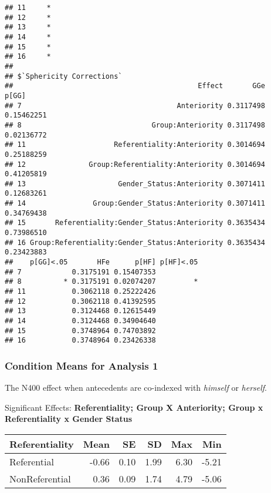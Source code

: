 \documentclass[
]{article}
\begin{document}
\begin{verbatim}
## 11     *
## 12     *
## 13     *
## 14     *
## 15     *
## 16     *
## 
## $`Sphericity Corrections`
##                                            Effect       GGe      p[GG]
## 7                                     Anteriority 0.3117498 0.15462251
## 8                               Group:Anteriority 0.3117498 0.02136772
## 11                     Referentiality:Anteriority 0.3014694 0.25188259
## 12               Group:Referentiality:Anteriority 0.3014694 0.41205819
## 13                      Gender_Status:Anteriority 0.3071411 0.12683261
## 14                Group:Gender_Status:Anteriority 0.3071411 0.34769438
## 15       Referentiality:Gender_Status:Anteriority 0.3635434 0.73986510
## 16 Group:Referentiality:Gender_Status:Anteriority 0.3635434 0.23423883
##    p[GG]<.05       HFe      p[HF] p[HF]<.05
## 7            0.3175191 0.15407353          
## 8          * 0.3175191 0.02074207         *
## 11           0.3062118 0.25222426          
## 12           0.3062118 0.41392595          
## 13           0.3124468 0.12615449          
## 14           0.3124468 0.34904640          
## 15           0.3748964 0.74703892          
## 16           0.3748964 0.23426338
\end{verbatim}

\hypertarget{condition-means-for-analysis-1}{%
\subsubsection{Condition Means for Analysis
1}\label{condition-means-for-analysis-1}}

The N400 effect when antecedents are co-indexed with \emph{himself} or
\emph{herself}.

Significant Effects: \textbf{Referentiality; Group X Anteriority; Group
x Referentiality x Gender Status}

\begin{longtable}[]{@{}lrrrrr@{}}
\toprule()
Referentiality & Mean & SE & SD & Max & Min \\
\midrule()
\endhead
Referential & -0.66 & 0.10 & 1.99 & 6.30 & -5.21 \\
NonReferential & 0.36 & 0.09 & 1.74 & 4.79 & -5.06 \\
\bottomrule()
\end{longtable}
\end{document}
